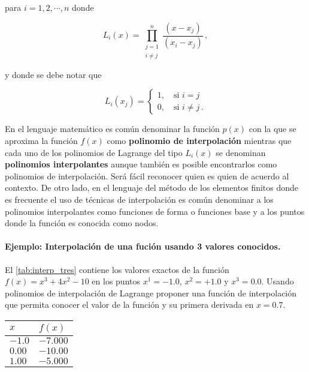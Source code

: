 para $i = 1, 2, \cdots, n$ donde

\begin{equation}\label{eq:interp_coef}
  L_i(x) = \prod_{\substack{j = 1\\ i \ne j}}^n \frac{(x - x_j)}{(x_i - x_j)}\, 
  ,
\end{equation}

y donde se debe notar que

\[L_i(x_j) =
\begin{cases}
1,\quad \text{si } i = j\\
0,\quad \text{si } i \neq j\, .
\end{cases}\]

\begin{tcolorbox}
En el lenguaje matemático es común denominar la función $p(x)$ con la que 
se aproxima la función $f(x)$ como \textbf{polinomio de interpolación} 
mientras que cada uno de los polinomios de Lagrange del tipo $L_i(x)$ se 
denominan \textbf{polinomios interpolantes} aunque también es posible 
encontrarlos como polinomios de interpolación. Será fácil reconocer quien 
es quien de acuerdo al contexto. De otro lado, en el lenguaje del método de 
los elementos finitos donde es frecuente el uso de técnicas de 
interpolación es común denominar a los polinomios interpolantes como 
funciones de forma o funciones base y a los puntos donde la función es 
conocida como nodos.
\end{tcolorbox}


\paragraph{Ejemplo: Interpolación de una fución usando 3 valores conocidos.}
El \cref{tab:interp_tres} contiene los valores exactos de la función $f(x) = {x^3} + 4{x^2} - 10$ en los puntos $x^1 =  - 1.0$, $x^2 =  + 1.0$ y $x^3 = 0.0$. Usando polinomios de interpolación de Lagrange proponer una función de interpolación que permita conocer el valor de la función y su primera derivada en $x=0.7$.
\begin{center}
\begin{tabular}{ll}
  \hline
  $x$ & $f(x)$ \\
  \hline 
  $-1.0$  & $-7.000$  \\
  $ 0.00$  & $-10.00$  \\
  $ 1.00$  & $-5.000$  \\
  \hline
\end{tabular}
\label{tab:interp_tres}
\end{center}

